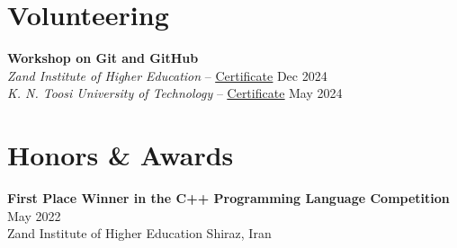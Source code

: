 \documentclass[letter,10pt]{article}
\newcommand{\customsquare}{\raisebox{0.25ex}{\scalebox{0.45}{$\blacksquare$}}}
\begin{document}
\section*{Volunteering}
\textbf{Workshop on Git and GitHub} \\ [2pt]
\textit{Zand Institute of Higher Education} -- \href{https://github.com/karami-mehdi/CV/blob/main/Assets/certificate-of-workshop-participation-karami-mehdi-zand-ihe.pdf}{\underline{Certificate}} \hfill Dec 2024 \\ [2pt]
\textit{K. N. Toosi University of Technology} -- \href{https://github.com/karami-mehdi/CV/blob/main/Assets/certificate-of-workshop-participation-karami-mehdi.pdf}{\underline{Certificate}} \hfill May 2024

\section*{Honors \& Awards}
\noindent
\textbf{First Place Winner in the C++ Programming Language Competition} \hfill May 2022 \\
Zand Institute of Higher Education \hfill Shiraz, Iran

\end{document}
